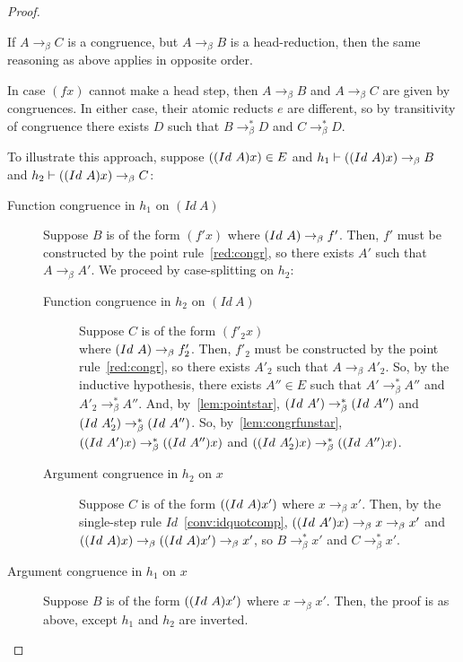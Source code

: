 \documentclass{lmcs}
\newcommand{\arr}{\rightarrow}
\newcommand{\barr}{\arr_{\beta}}
\begin{document}
\begin{proof}
\begin{description}
      If \(A \barr C\) is a congruence, but \(A \barr B\) is a head-reduction, then the same reasoning as above applies in opposite order.
  \item[\(A = (f x)\) and \((f x)\) cannot make a head step]
    In case \((f x)\) cannot make a head step, then \(A \barr B\) and \(A \barr C\) are given by congruences. In either case, their atomic reducts \(e\) are different, so by transitivity of congruence there exists \(D\) such that \(B \barr^{*} D\) and \(C \barr^{*} D\).
  \end{description}

  To illustrate this approach, suppose \((\comb[Id][A] x) \in E\) and \(h_1 \vdash (\comb[Id][A] x) \barr B\) and \(h_2 \vdash (\comb[Id][A] x) \barr C\):
  \begin{description}
  \item[Function congruence in $h_1$ on $(Id\ A)$]
    Suppose \(B\) is of the form \((f' x)\) where \(\comb[Id][A] \barr f'\). Then, \(f'\) must be constructed by the point rule~\eqref{red:congr}, so there exists \(A'\) such that \(A \barr A'\). We proceed by case-splitting on \(h_2\):
    \begin{description}
      \item[Function congruence in $h_2$ on $(Id\ A)$]
        Suppose \(C\) is of the form \((f'_2 x)\) \\where \(\comb[Id][A] \barr f'_2\). Then, \(f'_2\) must be constructed by the point rule~\eqref{red:congr}, so there exists \(A'_2\) such that \(A \barr A'_2\). So, by the inductive hypothesis, there exists \(A'' \in E\) such that \(A' \barr^{*} A''\) and \(A'_2 \barr^{*} A''\). And, by~\ref{lem:pointstar}, \(\comb[Id][A'] \barr^{*} \comb[Id][A'']\) and \(\comb[Id][A'_2] \barr^{*} \comb[Id][A'']\). So, by~\ref{lem:congrfunstar}, \((\comb[Id][A'] x) \barr^{*} (\comb[Id][A''] x)\) and \((\comb[Id][A'_2] x) \barr^{*} (\comb[Id][A''] x)\).
      \item[Argument congruence in $h_2$ on $x$]
        Suppose \(C\) is of the form \((\comb[Id][A] x')\) where \(x \barr x'\). Then, by the single-step rule \(Id\)~\ref{conv:idquotcomp}, \((\comb[Id][A'] x) \barr x \barr x'\) and \((\comb[Id][A] x) \barr (\comb[Id][A] x') \barr x'\), so \(B \barr^{*} x'\) and \(C \barr^{*} x'\).
    \end{description}
  \item[Argument congruence in $h_1$ on $x$]
    Suppose \(B\) is of the form \((\comb[Id][A] x')\) where \(x \barr x'\). Then, the proof is as above, except \(h_1\) and \(h_2\) are inverted.

\end{description}
\end{proof}
\end{document}
